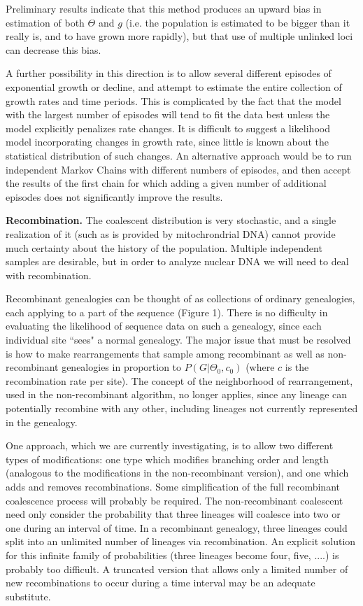 Preliminary results indicate that this method produces an upward bias in
estimation of both $\Theta$ and $g$ (i.e. the population is estimated to
be bigger than it really is, and to have grown more rapidly), but that
use of multiple unlinked loci can decrease this bias.

A further possibility in this direction is to allow several different
episodes of exponential growth or decline, and attempt to estimate the
entire collection of growth rates and time periods.  This is complicated
by the fact that the model with the largest number of episodes will 
tend to fit the data best unless the model explicitly penalizes
rate changes.  It is difficult to suggest a
likelihood model incorporating changes in growth rate, since little
is known about the statistical distribution of such changes.  An
alternative approach would be to run independent Markov Chains with
different numbers of episodes, and then accept the results of the first
chain for which adding a given number of additional episodes does not
significantly improve the results.  

{\bf Recombination.}
The coalescent distribution is very stochastic, and a single realization
of it (such as is provided by mitochrondrial DNA) cannot provide much
certainty about the history of the population.  Multiple independent
samples are desirable, but in order to analyze nuclear DNA we will need to
deal with recombination.

Recombinant genealogies can be thought of as collections of ordinary
genealogies, each applying to a part of the sequence (Figure 1).  There
is no difficulty in evaluating the likelihood of sequence data on such a
genealogy, since each individual site ``sees" a normal genealogy.  The
major issue that must be resolved is how to make rearrangements 
that sample among recombinant as well as non-recombinant
genealogies in proportion to $P(G|\Theta_0,c_0)$ (where $c$ is the
recombination rate per site).  The concept of the
neighborhood of rearrangement, used in the non-recombinant algorithm,
no longer applies, since any lineage can
potentially recombine with any other, including lineages not currently
represented in the genealogy.

One approach, which we are currently investigating, is to allow two
different types of modifications:  one type which modifies branching order
and length (analogous to the modifications in the non-recombinant
version), and one which adds and removes recombinations.  Some
simplification of the full recombinant coalescence process will probably
be required.  The non-recombinant coalescent need only consider the
probability that three lineages will coalesce into two or one during an
interval of time.  In a recombinant genealogy, three lineages could
split into an unlimited number of lineages via recombination.  An
explicit solution for this infinite family of probabilities (three
lineages become four, five, ....) is probably too difficult.  A
truncated version that allows only a limited number of new recombinations to
occur during a time interval may be an adequate substitute.

